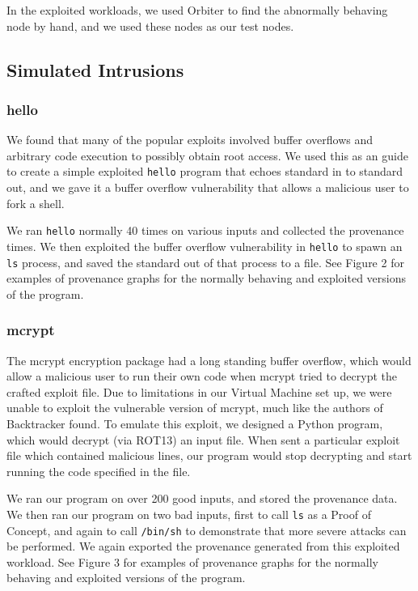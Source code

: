 \documentclass[10pt,twocolumn]{article}
\begin{document}
In the exploited workloads, we used Orbiter \cite{orbiter} to find the abnormally behaving node by hand, and we used these nodes as our test nodes.

\subsection{Simulated Intrusions}

\subsubsection{hello}
We found that many of the popular exploits \cite{metasploit, exploitdb} involved buffer overflows and arbitrary code execution to possibly obtain root access. We used this as an guide to create a simple exploited \texttt{hello} program that echoes standard in to standard out, and we gave it a buffer overflow vulnerability that allows a malicious user to fork a shell.

We ran \texttt{hello} normally 40 times on various inputs and collected the provenance times. We then exploited the buffer overflow vulnerability in \texttt{hello} to spawn an \texttt{ls} process, and saved the standard out of that process to a file. See Figure 2 for examples of provenance graphs for the normally behaving and exploited versions of the program.

\subsubsection{mcrypt}
The mcrypt encryption package had a long standing buffer overflow, which would allow a malicious user to run their own code when mcrypt tried to decrypt the crafted exploit file. Due to limitations in our Virtual Machine set up, we were unable to exploit the vulnerable version of mcrypt, much like the authors of Backtracker \cite{backtracker} found. To emulate this exploit, we designed a Python program, which would decrypt (via ROT13) an input file. When sent a particular exploit file which contained malicious lines, our program would stop decrypting and start running the code specified in the file.

We ran our program on over 200 good inputs, and stored the provenance data. We then ran our program on two bad inputs, first to call \texttt{ls} as a Proof of Concept, and again to call \texttt{/bin/sh} to demonstrate that more severe attacks can be performed. We again exported the provenance generated from this exploited workload. See Figure 3 for examples of provenance graphs for the normally behaving and exploited versions of the program.
\end{document}
